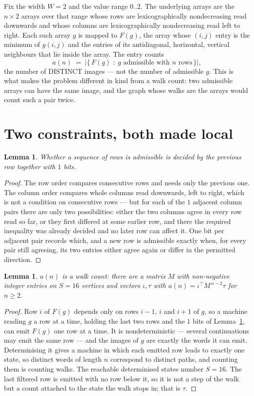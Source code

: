 \documentclass[11pt,a4paper]{article}
\theoremstyle{plain}
\newtheorem{lemma}[theorem]{Lemma}
\theoremstyle{definition}
\begin{document}
Fix the width $W=2$ and the value range $0..2$. The underlying arrays are the
$n\times2$ arrays over that range whose rows are lexicographically nondecreasing read downwards
and whose columns are lexicographically nondecreasing read left to right. Each such array $g$
is mapped to $F(g)$, the array whose $(i,j)$ entry is the minimum of $g(i,j)$ and the entries
of its antidiagonal, horizontal, vertical neighbours that lie inside the array. The entry counts
\[
a(n)\;=\;\bigl|\{\,F(g)\;:\;g\text{ admissible with }n\text{ rows}\,\}\bigr|,
\]
the number of DISTINCT images --- not the number of admissible $g$. This is what makes the
problem different in kind from a walk count: two admissible arrays can have the same image, and
the graph whose walks are the arrays would count such a pair twice.

\section{Two constraints, both made local}

\begin{lemma}\label{lem:local}
Whether a sequence of rows is admissible is decided by the previous row together with
$1$ bits.
\end{lemma}

\begin{proof}
The row order compares consecutive rows and needs only the previous one. The column order
compares whole columns read downwards, left to right, which is not a condition on consecutive
rows --- but for each of the $1$ adjacent column pairs there are only two possibilities:
either the two columns agree in every row read so far, or they first differed at some earlier
row, and there the required inequality was already decided and no later row can affect it. One
bit per adjacent pair records which, and a new row is admissible exactly when, for every pair
still agreeing, its two entries either agree again or differ in the permitted direction.
\end{proof}

\begin{lemma}\label{lem:det}
$a(n)$ is a walk count: there are a matrix $M$ with non-negative integer entries on $S=16$
vertices and vectors $\iota,\tau$ with $a(n)=\iota^{\!\top}M^{\,n-2}\tau$ for $n\ge2$.
\end{lemma}

\begin{proof}
Row $i$ of $F(g)$ depends only on rows $i-1$, $i$ and $i+1$ of $g$, so a machine reading $g$ a
row at a time, holding the last two rows and the $1$ bits of Lemma~\ref{lem:local}, can
emit $F(g)$ one row at a time. It is nondeterministic --- several continuations may emit the
same row --- and the images of $g$ are exactly the words it can emit. Determinising it gives a
machine in which each emitted row leads to exactly one state, so distinct words of length $n$
correspond to distinct paths, and counting them is counting walks. The reachable determinised
states number $S=16$. The last filtered row is emitted with no row below it, so it is not a
step of the walk but a count attached to the state the walk stops in; that is $\tau$.
\end{proof}
\end{document}
